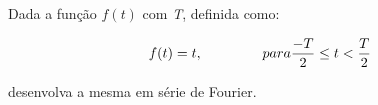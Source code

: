 \linespread{1.5}
Dada a função $f(t)$ com \textit{T}, definida como:

\begin{equation*}
    f(t)=t, \hspace{1.5cm} para \frac{-T}{2} \leq t < \frac{T}{2}
\end{equation*}

desenvolva a mesma em série de Fourier.